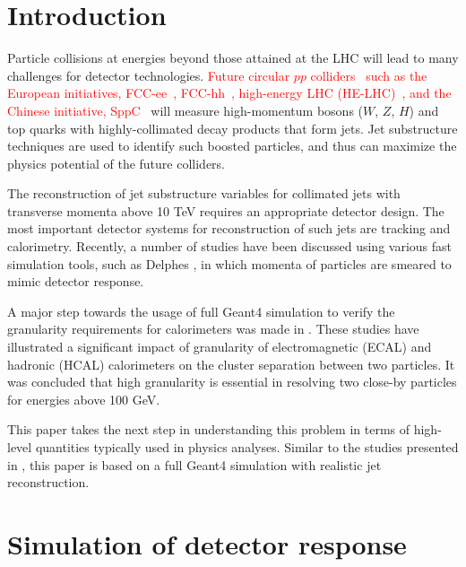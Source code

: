 \documentclass[final,1p,11pt]{elsarticle}
\begin{document}
\section{Introduction}

Particle collisions at energies  beyond those attained at the LHC will lead to many challenges for detector technologies.
\textcolor{red}{Future circular $pp$ colliders~\cite{Mangano:2018mur} such as the European initiatives, FCC-ee~\cite{Benedikt:2651299}, FCC-hh~\cite{Benedikt:2018csr}, high-energy LHC (HE-LHC)~\cite{Zimmermann:2018wdi}, and the Chinese initiative, SppC~\cite{Tang:2015qga} }will measure high-momentum bosons ($W$, $Z$, $H$) and top quarks with highly-collimated decay products that form jets. 
Jet substructure techniques are used
to identify such boosted particles, and thus can maximize the physics potential of the future colliders.

The reconstruction of jet substructure  variables for collimated jets with transverse momenta above 10 TeV 
requires an appropriate detector design. The most important detector systems for reconstruction of such jets are tracking and calorimetry.
Recently, a number of studies \cite{Calkins:2013ega,Chekanov:2015ihl,Coleman:2017fiq} 
have been discussed using various fast simulation tools, such as 
Delphes  \cite{deFavereau:2013fsa}, in which momenta of particles
are smeared to mimic detector response. 

A major step towards the usage of full Geant4 simulation to verify the granularity requirements 
for calorimeters was made in \cite{Chekanov:2016ppq}.
These studies have illustrated a significant impact 
of granularity of electromagnetic (ECAL) and hadronic (HCAL) calorimeters on the
cluster separation between two particles. It was concluded that high granularity is essential 
in resolving two close-by particles for energies above 100 GeV. 

This paper takes the next step in understanding this problem in terms of high-level quantities typically used in physics analyses. Similar to the studies presented in \cite{Chekanov:2016ppq}, this paper is based on a full
Geant4 simulation with realistic jet reconstruction.

\section{Simulation of detector response}
\label{sec:sim}
\end{document}
